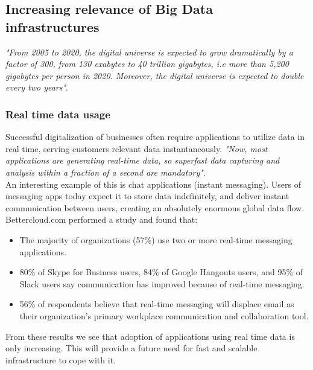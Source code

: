 \documentclass[a4paper,english]{report}
\begin{document}
			\subsection{Increasing relevance of Big Data infrastructures}
			\label{big_data}
			\textit{"From 2005 to 2020, the digital universe is expected to grow dramatically by a factor of 300, from 130 exabytes to 40 trillion gigabytes, i.e more than 5,200 gigabytes per person in 2020. Moreover, the digital universe is expected to double every two years"}\cite{bigdata}.
				\subsubsection{Real time data usage}
				Successful digitalization of businesses often require applications to utilize data in real time, serving customers relevant data instantaneously. \textit{"Now, most applications are generating real-time data, so superfast data capturing and analysis within a fraction of a second are mandatory"}\cite{management_analytics}.
				\\
				An interesting example of this is chat applications (instant messaging). Users of messaging apps today expect it to store data indefinitely, and deliver instant communication between users, creating an absolutely enormous global data flow. Bettercloud.com performed a study and found that\cite{bettercloud}:
				\begin{itemize}
					\item The majority of organizations (57\%) use two or more real-time messaging applications.
					\item 80\% of Skype for Business users, 84\% of Google Hangouts users, and 95\% of Slack users say communication has improved because of real-time messaging.
					\item 56\% of respondents believe that real-time messaging will displace email as their organization’s primary workplace communication and collaboration tool.
				\end{itemize}
				From these results we see that adoption of applications using real time data is only increasing. This will provide a future need for fast and scalable infrastructure to cope with it. 
\end{document}
